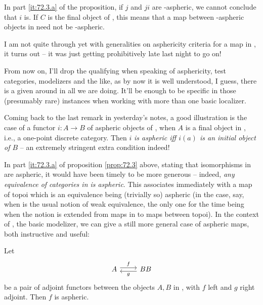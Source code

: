 \begin{remarknum}
  In part \ref{it:72.3.a} of the proposition, if $j$ and $ji$ are
  \scrW-aspheric, we cannot conclude that $i$ is. If $C$ is the final
  object of \Cat, this means that a map between \scrW-aspheric objects
  in \Cat{} need not be \scrW-aspheric.
\end{remarknum}

\bigbreak

\presectionfill{}\par

%
\label{sec:73}%
I am not quite through yet with generalities on asphericity criteria
for a map in \Cat, it turns out -- it was just getting prohibitively
late last night to go on!

From now on, I'll drop the qualifying \scrW{} when speaking of
asphericity, test categories, modelizers and the like, as by now it is
well understood, I guess, there is a given \scrW{} around in all we
are doing. It'll be enough to be specific in those (presumably rare)
instances when working with more than one basic localizer.

Coming back to the last remark in yesterday's notes, a good
illustration is the case of a functor $i:A\to B$ of aspheric objects
of \Cat, when $A$ is a final object in \Cat, i.e., a one-point
discrete category. Then $i$ \emph{is aspheric if{f} $i(a)$ is an
  initial object of $B$} -- an extremely stringent extra condition
indeed!

In part \ref{it:72.3.a} of proposition \ref{prop:72.3} above, stating
that isomorphisms in \Cat{} are aspheric, it would have been timely to
be more generous -- indeed, \emph{any equivalence of categories in
  \Cat{} is aspheric}. This associates immediately with a map of topoi
which is an equivalence being (trivially so) aspheric (in the case,
say, when \scrW{} is the usual notion of weak equivalence, the only
one for the time being when the notion is extended from maps in \Cat{}
to maps between topoi). In the context of \Cat, the basic modelizer,
we can give a still more general case of aspheric maps, both
instructive and useful:
\addtocounter{propositionnum}{3}
\begin{propositionnum}\label{prop:73.4}
  Let
  \[\begin{tikzcd}
    A \ar[r,shift left,"f"] & B \ar[l,shift left,"g"] B
  \end{tikzcd}\]
  be a pair of adjoint functors between the objects $A,B$ in \Cat,
  with $f$ left and $g$ right adjoint. Then $f$ is aspheric.
\end{propositionnum}

